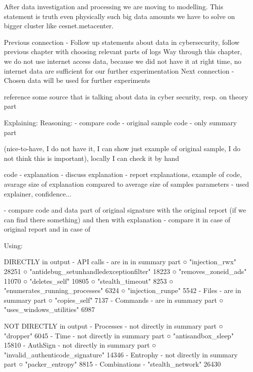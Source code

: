 After data investigation and processing we are moving to modelling. This statement is truth even physically such big data amounts we have to solve on bigger cluster like cesnet.metacenter.


Previous connection
- Follow up statements about data in cybersecurity, follow previous chapter with choosing relevant parts of logs
Way through this chapter, we do not use internet access data, because we did not have it at right time, no internet data are sufficient for our further experimentation
Next connection
- Chosen data will be used for further experiments


reference some source that is talking about data in cyber security, resp. on theory part
  


Explaining:
  Reasoning:
  - compare
    code - original sample
    code - only summary part

    (nice-to-have, I do not have it, I can show just example of original sample, I do not think this is important), locally I can check it by hand

    code - explanation
  - discuss explanation
  - report 
      explanations, example of code, avarage size of explanation compared to average size of samples
      parameters - used explainer, confidence...

  - compare code and data part of original signature with the original report (if we can find there something) and then with explanation
  - compare it in case of original report and in case of 



Using:

DIRECTLY in output
	- API calls - are in in summary part
		○ "injection_rwx" 28251
		○ "antidebug_setunhandledexceptionfilter" 18223
		○ "removes_zoneid_ads" 11070
		○ "deletes_self" 10805
		○ "stealth_timeout" 8253
		○ "enumerates_running_processes" 6324
		○ "injection_runpe"  5542
  - Files - are in summary part
		○ "copies_self" 7137
	- Commands - are in summary part
		○ "uses_windows_utilities" 6987

NOT DIRECTLY in output
	- Processes - not directly in summary part
		○ "dropper"  6045
	- Time - not directly in summary part
		○ "antisandbox_sleep" 15810
	- AuthSign - not directly in summary part
		○ "invalid_authenticode_signature" 14346
	- Entrophy - not directly in summary part
		○ "packer_entropy" 8815
	- Combinations - 
    "stealth_network" 26430
